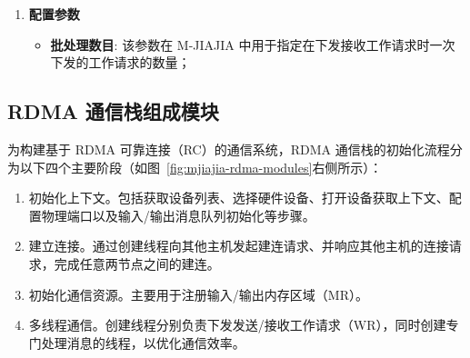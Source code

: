 {\begin{enumerate}[label=\arabic*., leftmargin=1em, align=left]
    \item \textbf{配置参数}
        \begin{itemize}[leftmargin=*, nosep]
            \item \textbf{批处理数目}: 该参数在 M-JIAJIA 中用于指定在下发接收工作请求时一次下发的工作请求的数量；
        \end{itemize}
\end{enumerate}








\subsection{RDMA 通信栈组成模块}

为构建基于 RDMA 可靠连接（RC）的通信系统，RDMA 通信栈的初始化流程分为以下四个主要阶段（如图~\ref{fig:mjiajia-rdma-modules}右侧所示）：
\begin{enumerate}[label=\arabic*.]
    \item 初始化上下文。包括获取设备列表、选择硬件设备、打开设备获取上下文、配置物理端口以及输入/输出消息队列初始化等步骤。
    \item 建立连接。通过创建线程向其他主机发起建连请求、并响应其他主机的连接请求，完成任意两节点之间的建连。
    \item 初始化通信资源。主要用于注册输入/输出内存区域（MR）。
    \item 多线程通信。创建线程分别负责下发发送/接收工作请求（WR），同时创建专门处理消息的线程，以优化通信效率。
\end{enumerate}

}
